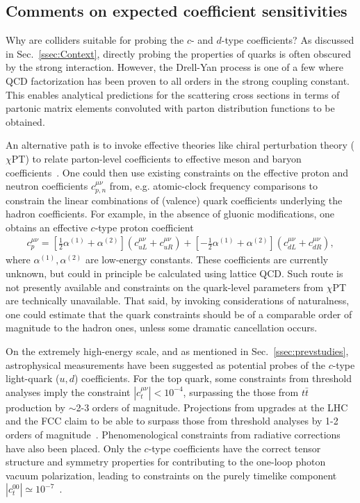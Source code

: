 \subsection{Comments on expected coefficient sensitivities}
%
Why are colliders suitable 
for probing the $c$- and $d$-type coefficients?
As discussed in Sec.~\ref{ssec:Context}, 
directly probing the properties of quarks
is often obscured by the strong interaction. 
However, the Drell-Yan process is one of a few 
where QCD factorization has been proven 
to all orders in the strong coupling constant. 
This enables analytical predictions for
the scattering cross sections in terms
of partonic matrix elements convoluted
with parton distribution functions to be obtained. 

An alternative path is to invoke 
effective theories like chiral perturbation
theory ($\chi$PT) to relate
parton-level coefficients to effective meson 
and baryon coefficients~\cite{Altschul:2019beo}.
One could then use existing constraints 
on the effective proton and neutron
coefficients $c_{p,n}^{\mu\nu}$ from, e.g.
atomic-clock frequency comparisons to constrain
the linear combinations of (valence) quark coefficients
underlying the hadron coefficients.
For example, in the absence of gluonic modifications,
one obtains an effective $c$-type
proton coefficient \cite{Kamand:2016xhv}
\begin{align}
c_p^{\mu\nu} = \left[\frac{1}{2}\alpha^{(1)} + \alpha^{(2)}\right]
(c_{uL}^{\mu\nu}+ c_{uR}^{\mu\nu}) 
+ \left[-\frac{1}{2}\alpha^{(1)} + \alpha^{(2)}\right]
(c_{dL}^{\mu\nu}+c_{dR}^{\mu\nu}),
\end{align}
where $\alpha^{(1)}, \alpha^{(2)}$ are low-energy constants.
These coefficients are currently unknown, but could 
in principle be calculated using lattice QCD.
Such route is not presently available and 
constraints on the quark-level parameters 
from $\chi$PT are technically unavailable. 
That said, by invoking considerations of naturalness, 
one could estimate that the quark constraints
should be of a comparable order of magnitude to the hadron ones,
unless some dramatic cancellation occurs. 

On the extremely high-energy scale, and as 
mentioned in Sec.~\ref{ssec:prevstudies}, 
astrophysical measurements have been suggested
as potential probes of the $c$-type light-quark ($u,d$)
coefficients. For the top quark, 
some constraints from threshold analyses 
imply the constraint
$|c_t^{\mu\nu}| < 10^{-4}$, 
surpassing the those from $t\bar t$
production by $\sim$2-3 orders of magnitude. 
Projections from upgrades at the LHC 
and the FCC claim to be able to surpass
those from threshold analyses
by 1-2 orders of magnitude~\cite{Carle:2019ouy}.
Phenomenological constraints from radiative corrections
have also been placed. Only the $c$-type coefficients
have the correct tensor structure 
and symmetry properties
for contributing to the one-loop 
photon vacuum polarization, leading to 
constraints on the purely timelike component
$|c_t^{00}| \simeq 10^{-7}$~\cite{Satunin:2017wmk}. 

